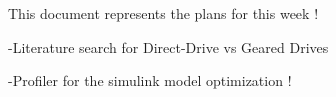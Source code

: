 \documentclass[12pt]{article}
\begin{document}
 This document represents the plans for this week ! 
 
 -Literature search for Direct-Drive vs Geared Drives 
 
 -Profiler for the simulink model optimization ! 
 

 
\end{document}
